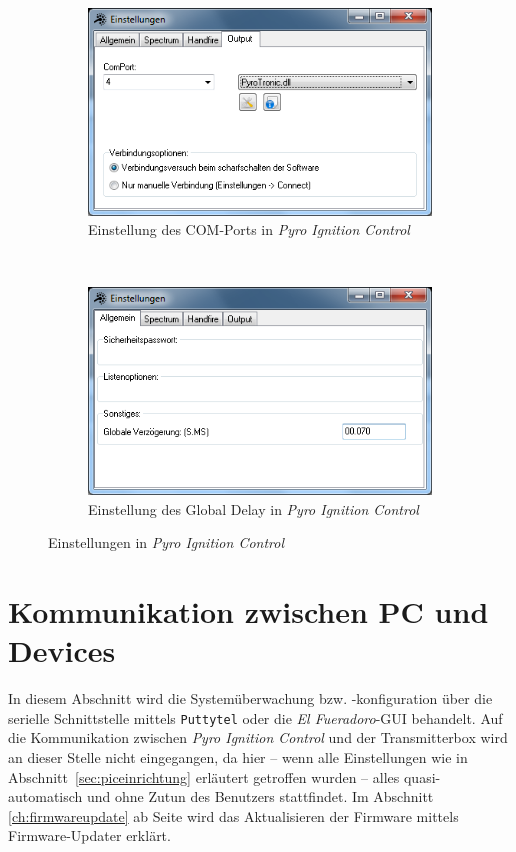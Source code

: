 \documentclass[pdftex, parskip, numbers=noenddot, toc=listof]{scrbook}
\newcommand{\pic}{\emph{Pyro Ignition Control}}
\newcommand{\anlage}{\emph{El Fueradoro}}
\begin{document}
	\begin{figure}
		\begin{subfigure}[t]{\textwidth}
			\centering
			\includegraphics[width=.75\textwidth]{Bilder/pic-comport}
			\caption{Einstellung des COM-Ports in {\pic}}
			\label{fig:pic-comport}
		\end{subfigure} \\[50pt]
		\begin{subfigure}[t]{\textwidth}
			\centering
			\includegraphics[width=.75\textwidth]{Bilder/pic-delay}
			\caption{Einstellung des Global Delay in \pic}
			\label{fig:pic-delay}
		\end{subfigure}
		\caption{Einstellungen in {\pic}}
	\end{figure}

	\chapter{Kommunikation zwischen PC und Devices}
	\label{ch:kommunikationpc}

	In diesem Abschnitt wird die Systemüberwachung bzw. -konfiguration über die serielle Schnittstelle mittels \texttt{Puttytel} oder die {\anlage}-GUI behandelt. Auf die Kommunikation zwischen {\pic} und der Transmitterbox wird an dieser Stelle nicht eingegangen, da hier -- wenn alle Einstellungen wie in Abschnitt~\ref{sec:piceinrichtung} erläutert getroffen wurden -- alles quasi-automatisch und ohne Zutun des Benutzers stattfindet. Im Abschnitt \ref{ch:firmwareupdate} ab Seite \pageref{ch:firmwareupdate} wird das Aktualisieren der Firmware mittels Firmware-Updater erklärt.
\end{document}
